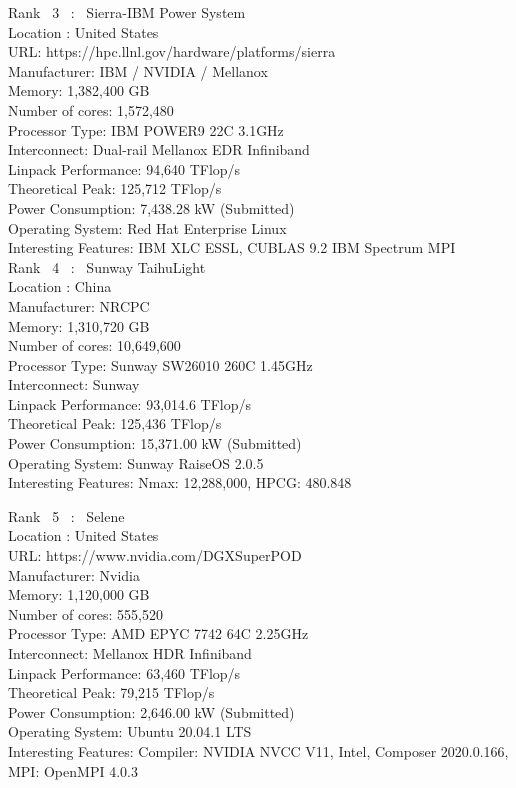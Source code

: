 \documentclass{article}
\begin{document}
\newpage

Rank \ 3 \ : \ Sierra-IBM Power System \\
Location : United States\\
URL:  https://hpc.llnl.gov/hardware/platforms/sierra\\
Manufacturer: IBM / NVIDIA / Mellanox\\
Memory: 1,382,400 GB\\
Number of cores: 1,572,480\\
 Processor Type: IBM POWER9 22C 3.1GHz\\
Interconnect: Dual-rail Mellanox EDR Infiniband\\
Linpack Performance: 94,640 TFlop/s\\
Theoretical Peak: 125,712 TFlop/s\\
Power Consumption: 7,438.28 kW (Submitted) \\
Operating System: Red Hat Enterprise Linux\\
Interesting Features: IBM XLC ESSL, CUBLAS 9.2 IBM Spectrum MPI\\

Rank \ 4 \ : \ Sunway TaihuLight \\
Location : China\\
Manufacturer: NRCPC\\
Memory: 1,310,720 GB\\
Number of cores: 10,649,600\\
 Processor Type: Sunway SW26010 260C 1.45GHz\\
Interconnect: Sunway\\
Linpack Performance: 93,014.6 TFlop/s\\
Theoretical Peak: 125,436 TFlop/s\\
Power Consumption: 15,371.00 kW (Submitted)\\
Operating System: Sunway RaiseOS 2.0.5\\
Interesting Features: Nmax: 12,288,000, HPCG: 480.848\\
\newpage

Rank \ 5 \ : \ Selene \\
Location : United States\\
URL: https://www.nvidia.com/DGXSuperPOD\\
Manufacturer: Nvidia\\
Memory: 1,120,000 GB\\
Number of cores: 555,520\\
 Processor Type: AMD EPYC 7742 64C 2.25GHz\\
Interconnect: Mellanox HDR Infiniband\\
Linpack Performance: 63,460 TFlop/s\\
Theoretical Peak: 79,215 TFlop/s\\
Power Consumption: 2,646.00 kW (Submitted)\\
Operating System: Ubuntu 20.04.1 LTS\\
Interesting Features: Compiler: NVIDIA NVCC V11, Intel, Composer 2020.0.166, MPI: OpenMPI 4.0.3\\
\end{document}
